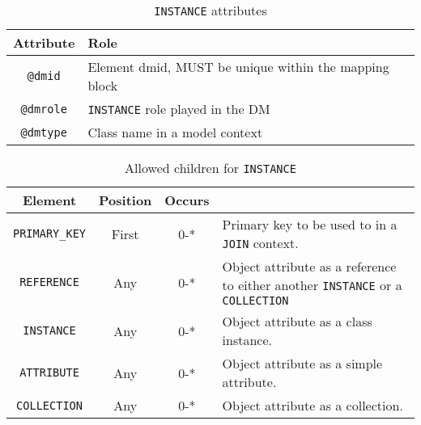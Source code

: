 \begin{table}[!htbp]
\small
\centering
\begin{tabulary}{\linewidth}{|c|J|}       
       \hline 
            \textbf{Attribute} & 
            \textbf {Role}\\
       \hline         \hline  
            \texttt{@dmid} & 
            Element dmid, MUST be unique within the mapping block  \\
        \hline 
            \texttt{@dmrole} & 
            \texttt{INSTANCE} role played in the DM \\
        \hline 
            \texttt{@dmtype} & 
            Class name in a model context\\
        \hline 
     \end{tabulary}
     \caption{\texttt{INSTANCE} attributes} 
     \label{tbl:instance-att}
 \end{table}   
 


 
\begin{table}[!htbp]
\small
\centering
\begin{tabulary}{\linewidth}{|c |c |c|J|}
    \hline 
        \textbf{Element} &
        \textbf{Position} &
        \textbf{Occurs} &
        \\
    \hline      \hline  
        \texttt{PRIMARY\_KEY}  &        
        First &           
        0-* &
        Primary key to be used to in a \texttt{JOIN} context.\\
    \hline    
        \texttt{REFERENCE}  &        
        Any &           
        0-* &
         Object attribute as a reference to either another \texttt{INSTANCE} or a \texttt{COLLECTION} \\
    \hline    
        \texttt{INSTANCE} &           
        Any &           
        0-* &
         Object attribute as a class instance. \\
    \hline    
        \texttt{ATTRIBUTE} &           
        Any &           
        0-* &
       Object attribute as a simple attribute. \\
    \hline    
        \texttt{COLLECTION} &           
        Any &           
        0-* &
         Object attribute  as a collection.\\
    \hline 
\end{tabulary}
     \caption{Allowed children for \texttt{INSTANCE}} 
     \label{tbl:instance-chilren}
\end{table}
 
